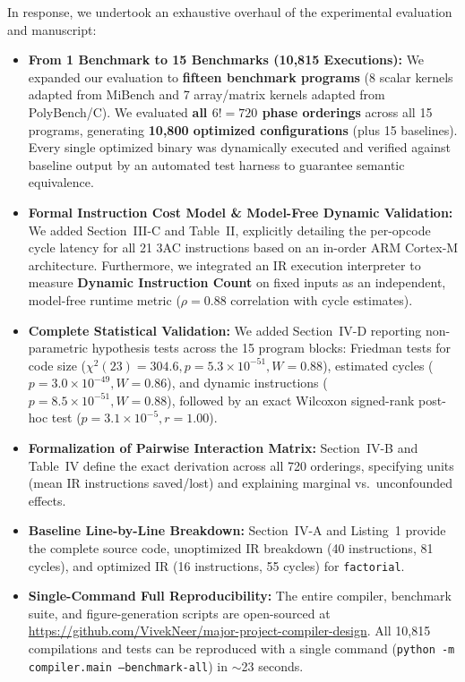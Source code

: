 \documentclass[10pt,a4paper]{article}
\begin{document}
In response, we undertook an exhaustive overhaul of the experimental evaluation and manuscript:
\begin{itemize}[itemsep=2pt,parsep=0pt,topsep=2pt]
    \item \textbf{From 1 Benchmark to 15 Benchmarks (10,815 Executions):} We expanded our evaluation to \textbf{fifteen benchmark programs} (8 scalar kernels adapted from MiBench and 7 array/matrix kernels adapted from PolyBench/C). We evaluated \textbf{all $6! = 720$ phase orderings} across all 15 programs, generating \textbf{10,800 optimized configurations} (plus 15 baselines). Every single optimized binary was dynamically executed and verified against baseline output by an automated test harness to guarantee semantic equivalence.
    \item \textbf{Formal Instruction Cost Model \& Model-Free Dynamic Validation:} We added Section~III-C and Table~II, explicitly detailing the per-opcode cycle latency for all 21 3AC instructions based on an in-order ARM Cortex-M architecture. Furthermore, we integrated an IR execution interpreter to measure \textbf{Dynamic Instruction Count} on fixed inputs as an independent, model-free runtime metric ($\rho = 0.88$ correlation with cycle estimates).
    \item \textbf{Complete Statistical Validation:} We added Section~IV-D reporting non-parametric hypothesis tests across the 15 program blocks: Friedman tests for code size ($\chi^2(23) = 304.6, p = 5.3 \times 10^{-51}, W = 0.88$), estimated cycles ($p = 3.0 \times 10^{-49}, W = 0.86$), and dynamic instructions ($p = 8.5 \times 10^{-51}, W = 0.88$), followed by an exact Wilcoxon signed-rank post-hoc test ($p = 3.1 \times 10^{-5}, r = 1.00$).
    \item \textbf{Formalization of Pairwise Interaction Matrix:} Section~IV-B and Table~IV define the exact derivation across all 720 orderings, specifying units (mean IR instructions saved/lost) and explaining marginal vs.\ unconfounded effects.
    \item \textbf{Baseline Line-by-Line Breakdown:} Section~IV-A and Listing~1 provide the complete source code, unoptimized IR breakdown (40 instructions, 81 cycles), and optimized IR (16 instructions, 55 cycles) for \texttt{factorial}.
    \item \textbf{Single-Command Full Reproducibility:} The entire compiler, benchmark suite, and figure-generation scripts are open-sourced at \url{https://github.com/VivekNeer/major-project-compiler-design}. All 10,815 compilations and tests can be reproduced with a single command (\texttt{python -m compiler.main --benchmark-all}) in $\sim$23 seconds.
\end{itemize}
\end{document}
